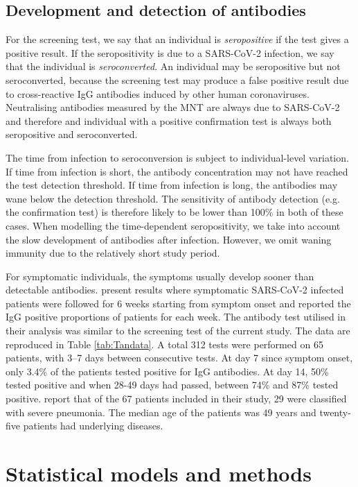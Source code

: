 \documentclass[aoas]{imsart}
\begin{document}
\subsection{Development and detection of antibodies}

For the screening test, we say that an individual is \emph{seropositive} if the test gives a positive result. If the seropositivity is due to a SARS-CoV-2 infection, we say that the individual is \emph{seroconverted}. An individual may be seropositive but not seroconverted, because the screening test may produce a false positive result due to cross-reactive IgG antibodies induced by other human coronaviruses. Neutralising antibodies measured by the MNT are always due to SARS-CoV-2 and therefore and individual with a positive confirmation test is always both seropositive and seroconverted. 

The time from infection to seroconversion is subject to individual-level variation. If time from infection is short, the antibody concentration may not have reached the test detection threshold. If time from infection is long, the antibodies may wane below the detection threshold. The sensitivity of antibody detection (e.g. the confirmation test) is therefore likely to be lower than 100\% in both of these cases. When modelling the time-dependent seropositivity, we take into account the slow development of antibodies after infection. However, we omit waning immunity due to the relatively short study period.

For symptomatic individuals, the symptoms usually develop sooner than detectable antibodies. \cite{Tan2020} present results where symptomatic SARS-CoV-2 infected patients were followed for 6 weeks starting from symptom onset and reported the IgG positive proportions of patients for each week. The antibody test utilised in their analysis was similar to the screening test of the current study. The data are reproduced in Table \ref{tab:Tandata}. A total 312 tests were performed on 65 patients, with 3–7 days between consecutive tests. At day 7 since symptom onset, only 3.4\% of the patients tested positive for IgG antibodies. At day 14, 50\% tested positive and when 28-49 days had passed, between 74\% and 87\% tested positive. \cite{Tan2020} report that of the 67 patients included in their study, 29 were classified with severe pneumonia. The median age of the patients was 49 years and twenty-five patients had underlying diseases.


\section{Statistical models and methods}
\end{document}
